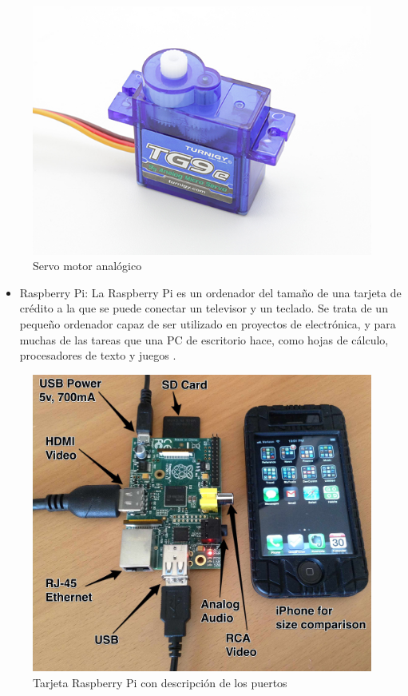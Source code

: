 \begin{figure}[hbtp]
\centering
\includegraphics[scale=0.3]{imagenes/turnigy.jpg}
\caption{Servo motor analógico}
\end{figure}

\begin{itemize}
\item Raspberry Pi: La Raspberry Pi es un ordenador del tamaño de una tarjeta de crédito a la que se puede conectar un 
televisor y un teclado. Se trata de un pequeño ordenador capaz de ser utilizado en proyectos de electrónica, y para muchas 
de las tareas que una PC de escritorio hace, como hojas de cálculo, procesadores de texto y juegos \cite{raspberry}. 

\end{itemize}

\begin{figure}[hbtp]
\centering
\includegraphics[scale=0.1]{imagenes/raspberry_pi_iphone.jpg}
\caption{Tarjeta Raspberry Pi con descripción de los puertos}
\end{figure}

